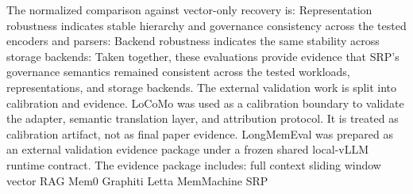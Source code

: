 {}The normalized comparison against vector-only recovery is:\markdownRendererInterblockSeparator
{}\markdownRendererInterblockSeparator
{}Representation robustness indicates stable hierarchy and governance consistency across the tested encoders and parsers:\markdownRendererInterblockSeparator
{}\markdownRendererInterblockSeparator
{}Backend robustness indicates the same stability across storage backends:\markdownRendererInterblockSeparator
{}\markdownRendererInterblockSeparator
{}Taken together, these evaluations provide evidence that SRP's governance semantics remained consistent across the tested workloads, representations, and storage backends.\markdownRendererInterblockSeparator
{}
\markdownRendererSectionEnd \markdownRendererSectionBegin
{}\markdownRendererInterblockSeparator
{}The external validation work is split into calibration and evidence.\markdownRendererParagraphSeparator
{}LoCoMo was used as a calibration boundary to validate the adapter, semantic translation layer, and attribution protocol. It is treated as calibration artifact, not as final paper evidence.\markdownRendererParagraphSeparator
{}LongMemEval was prepared as an external validation evidence package under a frozen shared local-vLLM runtime contract. The evidence package includes:\markdownRendererInterblockSeparator
{}\markdownRendererUlBeginTight
\markdownRendererUlItem full context\markdownRendererUlItemEnd 
\markdownRendererUlItem sliding window\markdownRendererUlItemEnd 
\markdownRendererUlItem vector RAG\markdownRendererUlItemEnd 
\markdownRendererUlItem Mem0\markdownRendererUlItemEnd 
\markdownRendererUlItem Graphiti\markdownRendererUlItemEnd 
\markdownRendererUlItem Letta\markdownRendererUlItemEnd 
\markdownRendererUlItem MemMachine\markdownRendererUlItemEnd 
\markdownRendererUlItem SRP\markdownRendererUlItemEnd 
\markdownRendererUlEndTight \markdownRendererInterblockSeparator
